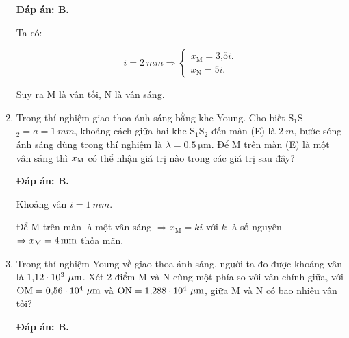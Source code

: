 \begin{enumerate}[label=\bfseries Câu \arabic*:]
{\begin{mcq}
		\end{mcq}
	}
	
	\loigiai
	{		\textbf{Đáp án: B.}
		
		Ta có: 
		
		$$ i = \SI{2}{mm} \Rightarrow \begin{cases}
			x_\text{M} = \text{3,5}i.\\
			x_\text{N} = 5i.
		\end{cases}
		$$
		
		Suy ra M là vân tối, N là vân sáng.
	
	}
		\item {} 
	\cauhoi
	{Trong thí nghiệm giao thoa ánh sáng bằng khe Young. Cho biết S$_1$S$_2= a = \SI{1}{mm}$, khoảng cách giữa hai khe S$_1$S$_2$ đến màn (E) là $\SI{2}{m}$, bước sóng ánh sáng dùng trong thí nghiệm là  $\lambda = \SI{0,5}{\micro\meter}$. Để M trên màn (E) là một vân sáng thì $x_\text M$ có thể nhận giá trị nào trong các giá trị sau đây?
		
	}
	
	\loigiai
	{		\textbf{Đáp án: B.}
		
		Khoảng vân $i = \SI{1}{mm}.$
		
		Để M trên màn là một vân sáng $\Rightarrow x_\text{M} = ki$ với $k$ là số nguyên $\Rightarrow x_\text M = \SI{4}{mm}$ thỏa mãn. 
	}
		\item {} 
	\cauhoi
	{Trong thí nghiệm Young về giao thoa ánh sáng, người ta đo được khoảng vân là $\text{1,12} \cdot 10^3\ \mu \text m$. Xét 2 điểm M và N cùng một phía so với vân chính giữa, với $\text{OM} = \text{0,56}\cdot 10^4\ \mu \text m$ và $\text{ON} = \text{1,288}\cdot 10^4\ \mu \text m$, giữa M và N có bao nhiêu vân tối?
		
	}
	
	\loigiai
	{		\textbf{Đáp án: B.}
		
}
\end{enumerate}
